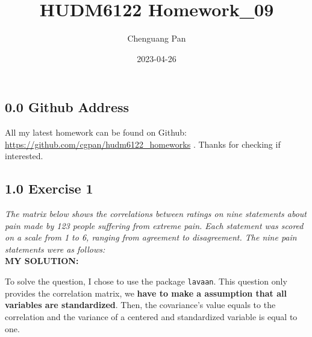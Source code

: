 \documentclass[
]{article}
\title{HUDM6122 Homework\_09}
\author{Chenguang Pan}
\date{2023-04-26}
\begin{document}
\maketitle

\hypertarget{github-address}{%
\subsection{0.0 Github Address}\label{github-address}}

All my latest homework can be found on Github:
\url{https://github.com/cgpan/hudm6122_homeworks} . Thanks for checking
if interested.

\hypertarget{exercise-1}{%
\subsection{1.0 Exercise 1}\label{exercise-1}}

\emph{The matrix below shows the correlations between ratings on nine
statements about pain made by 123 people suffering from extreme pain.
Each statement was scored on a scale from 1 to 6, ranging from agreement
to disagreement. The nine pain statements were as follows:}\\
\textbf{MY SOLUTION: }

To solve the question, I chose to use the package \texttt{lavaan}. This
question only provides the correlation matrix, we \textbf{have to make a
assumption that all variables are standardized}. Then, the covariance's
value equals to the correlation and the variance of a centered and
standardized variable is equal to one.
\end{document}
